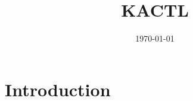 \documentclass[]{article}
\title{KACTL}
\author{}
\date{\today}
\begin{document}
\maketitle

\section{Introduction}

\end{document}
